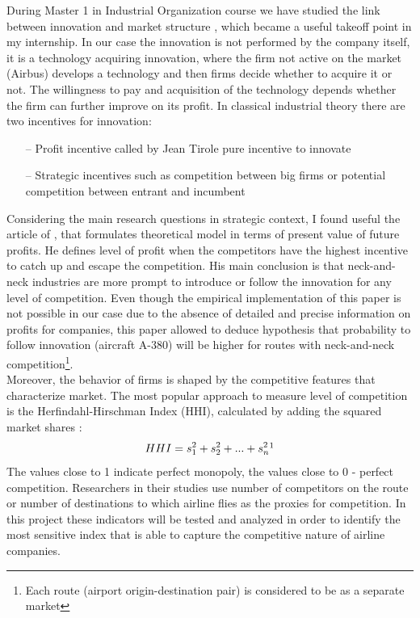 \documentclass[titlepage, 11pt]{article}
\begin{document}
\tab During Master 1 in Industrial Organization course we have studied the link between innovation and market structure \cite{IO}, which became a useful takeoff point in my internship. In our case the innovation is not performed by the company itself, it is a technology acquiring innovation, where the firm not active on the market (Airbus) develops a technology and then firms decide whether to acquire it or not. The willingness to pay and acquisition of the technology depends whether the firm can further improve on its profit. In classical industrial theory there are two incentives for innovation:  
\begin{itemize}
\item[--] Profit incentive called by Jean Tirole pure incentive to innovate \cite{IO}	
\item[--] Strategic incentives such as competition between big firms or potential competition between entrant and incumbent \cite{IO}
\end{itemize} 
\tab Considering the main research questions in strategic context, I found useful the article of \citeauthor{aghion} \cite{aghion}, that formulates theoretical model in terms of present value of future profits. He defines level of profit when the competitors have the highest incentive to catch up and escape the competition. His main conclusion is that neck-and-neck industries are more prompt to introduce or follow the innovation for any level of competition. Even though the empirical implementation of this paper is not possible in our case due to the absence of detailed and precise information on profits for companies, this paper allowed to deduce hypothesis that probability to follow  innovation (aircraft A-380) will be higher for routes with neck-and-neck competition\footnote{Each route (airport origin-destination pair) is considered to be as a separate market}.\\
\tab Moreover, the behavior of firms is shaped by the competitive features that characterize market. The most popular approach to measure level of competition is the Herfindahl-Hirschman Index (HHI), calculated by adding the squared market shares \cite{Investopedia}:
\begin{equation}
HHI = s_1^2+s_2^2+...+s_n^2\footnote{Where $s_i$ is the market share of firm $i$ on the market}
\end{equation}
The values close to 1 indicate perfect monopoly, the values close to 0 - perfect competition. Researchers in their studies use number of competitors on the route or number of destinations to which airline flies as the proxies for competition. In this project these indicators will be tested and analyzed in order to identify the most sensitive index that is able to capture the competitive nature of airline companies. \\ 
\end{document}
